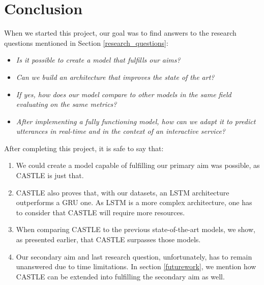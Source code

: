 \documentclass[nofilelist]{cslthse-msc}
\begin{document}






\chapter{Conclusion}
When we started this project, our goal was to find answers to the research questions mentioned in Section \ref{research_questions}:

\begin{itemize}
    \item \textit{Is it possible to create a model that fulfills our aims?}
    \item \textit{Can we build an architecture that improves the state of the art?}
    \item \textit{If yes, how does our model compare to other models in the same field evaluating on the same metrics?}
    \item \textit{After implementing a fully functioning model, how can we adapt it to predict utterances in real-time and in the context of an interactive service?}
\end{itemize}


After completing this project, it is safe to say that: 
\begin{enumerate}
    \item We could create a model capable of fulfilling our primary aim was possible, as CASTLE is just that.
    \item CASTLE also proves that, with our datasets, an LSTM architecture outperforms a GRU one. As LSTM is a more complex architecture, one has to consider that CASTLE will require more resources. 
    \item When comparing CASTLE to the previous state-of-the-art models, we show, as presented earlier, that CASTLE surpasses those models. 
    \item Our secondary aim and last research question, unfortunately, has to remain unanswered due to time limitations. In section \ref{futurework}, we mention how CASTLE can be extended into fulfilling the secondary aim as well.
\end{enumerate}
\end{document}
